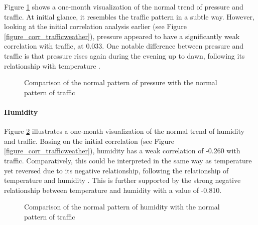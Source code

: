 Figure \ref{figure_traffic_vs_pressure} shows a one-month visualization of the normal trend of pressure and traffic. At initial glance, it resembles the traffic pattern in a subtle way. However, looking at the initial correlation analysis earlier (see Figure \ref{figure_corr_trafficweather}), pressure appeared to have a significantly weak correlation with traffic, at 0.033. One notable difference between pressure and traffic is that pressure rises again during the evening up to dawn, following its relationship with temperature .


\begin{figure}[h]
  \centering
  \captionsetup{justification=centering}
  \caption{Comparison of the normal pattern of pressure with the normal pattern of traffic}
\label{figure_traffic_vs_pressure}
\end{figure}


\paragraph{Humidity}

Figure \ref{figure_traffic_vs_humidity} illustrates a one-month visualization of the normal trend of humidity and traffic. Basing on the initial correlation (see Figure \ref{figure_corr_trafficweather}), humidity has a weak correlation of -0.260 with traffic. Comparatively, this could be interpreted in the same way as temperature yet reversed due to its negative relationship, following the relationship of temperature and humidity . This is further supported by the strong negative relationship between temperature and humidity with a value of -0.810.


\begin{figure}[h]
  \centering
  \captionsetup{justification=centering}
  \caption{Comparison of the normal pattern of humidity with the normal pattern of traffic}
\label{figure_traffic_vs_humidity}
\end{figure}

